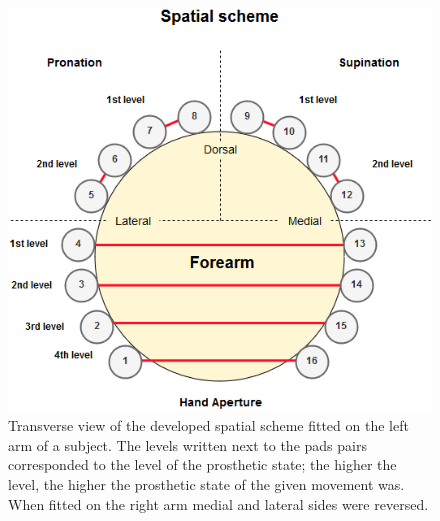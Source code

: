 \begin{figure}[h]                 
	\includegraphics[width=.9\textwidth]{figures/El_array_spatial}  
	\caption{Transverse view of the developed spatial scheme fitted on the left arm of a subject. The levels written next to the pads pairs corresponded to the level of the prosthetic state; the higher the level, the higher the prosthetic state of the given movement was. When fitted on the right arm medial and lateral sides were reversed.}
	\label{fig:pa:spatial} 
\end{figure}   

